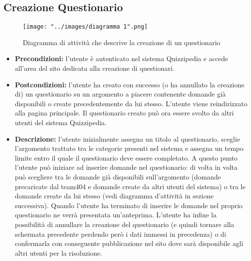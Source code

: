 \subsection{Creazione Questionario}
\begin{figure}[h!]
\begin{center}
	\centerline{\texttt{[image: "../images/diagramma 1".png]}}
	\caption{Diagramma di attività che descrive la creazione di un questionario}
\end{center}
\end{figure}
\begin{itemize}
\item\textbf{Precondizioni:} l'utente è autenticato nel sistema Quizzipedia e accede all'area del sito dedicata alla creazione di questionari.
\item\textbf{Postcondizioni:} l'utente ha creato con successo (o ha annullato la creazione di) un questionario su un argomento a piacere contenente domande già disponibili o create precedentemente da lui stesso. L'utente viene reindirizzato alla pagina principale. Il questionario creato può ora essere svolto da altri utenti del sistema Quizzipedia. %
\item\textbf{Descrizione:} l'utente inizialmente assegna un titolo al questionario, sceglie l'argomento trattato tra le categorie presenti nel sistema e assegna un tempo limite entro il quale il questionario deve essere completato. A questo punto l'utente può iniziare ad inserire domande nel questionario: di volta in volta può scegliere tra le domande già disponibili sull'argomento (domande precaricate dal team404 e domande create da altri utenti del sistema) o tra le domande create da lui stesso (vedi diagramma d'attività in sezione successiva). Quando l'utente ha terminato di inserire le domande nel proprio questionario ne verrà presentata un'anteprima. L'utente ha infine la possibilità di annullare la creazione del questionario (e quindi tornare alla schermata precedente perdendo però i dati immessi in precedenza) o di confermarla con conseguente pubblicazione nel sito dove sarà disponibile agli altri utenti per la risoluzione.
\end{itemize}

\newpage
